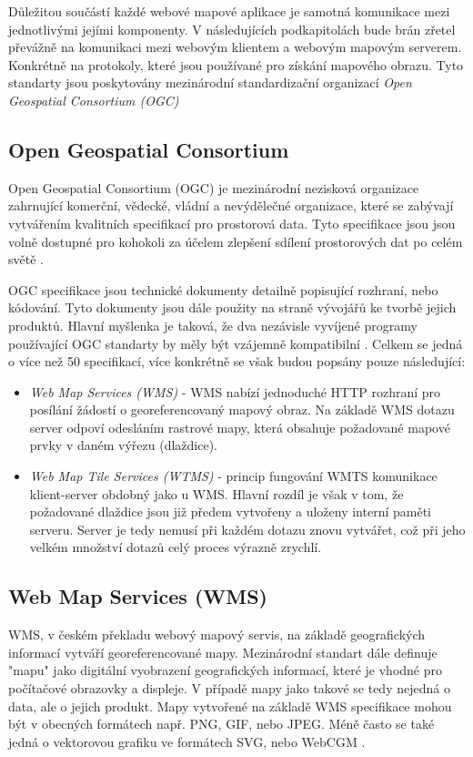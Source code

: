 Důležitou součástí každé webové mapové aplikace je samotná komunikace mezi jednotlivými jejími komponenty. V následujících podkapitolách bude brán zřetel převážně na komunikaci mezi webovým klientem a webovým mapovým serverem. Konkrétně na protokoly, které jsou používané pro získání mapového obrazu. Tyto standarty jsou poskytovány mezinárodní standardizační organizací \textit{Open Geospatial Consortium (OGC)}

\subsection{Open Geospatial Consortium}
Open Geospatial Consortium (OGC) je mezinárodní nezisková organizace zahrnující komerční, vědecké, vládní a nevýdělečné organizace, které se zabývají vytvářením kvalitních specifikací pro prostorová data. Tyto specifikace jsou jsou volně dostupné pro kohokoli za účelem zlepšení sdílení prostorových dat po celém světě \cite{oqc_web}.

OGC specifikace jsou technické dokumenty detailně popisující rozhraní, nebo kódování. Tyto dokumenty jsou dále použity na straně vývojářů ke tvorbě jejich produktů. Hlavní myšlenka je taková, že dva nezávisle vyvíjené programy používající OGC standarty by měly být vzájemně kompatibilní \cite{oqc_web}. Celkem se jedná o více než 50 specifikací, více konkrétně se však budou popsány pouze následující:

\newpage
\begin{itemize}
	\item\textit{Web Map Services (WMS)} - WMS nabízí jednoduché HTTP rozhraní pro posílání žádostí o georeferencovaný mapový obraz. Na základě WMS dotazu server odpoví odesláním rastrové mapy, která obsahuje požadované mapové prvky v daném výřezu (dlaždice).
	 
	\item\textit{Web Map Tile Services (WTMS)} - princip fungování WMTS komunikace klient-server obdobný jako u WMS. Hlavní rozdíl je však v tom, že požadované dlaždice jsou již předem vytvořeny a uloženy interní paměti serveru. Server je tedy nemusí při každém dotazu znovu vytvářet, což při jeho velkém množství dotazů celý proces výrazně zrychlí. 
\end{itemize}

\subsection{Web Map Services (WMS)}
WMS, v českém překladu webový mapový servis, na základě geografických informací vytváří georeferencované mapy. Mezinárodní standart dále definuje "mapu" jako digitální vyobrazení geografických informací, které je vhodné pro počítačové obrazovky a displeje. V případě mapy jako takové se tedy nejedná o data, ale o jejich produkt. Mapy vytvořené na základě WMS specifikace mohou být v obecných formátech např. PNG, GIF, nebo JPEG. Méně často se také jedná o vektorovou grafiku ve formátech SVG, nebo WebCGM \cite{oqc_wms}.     

